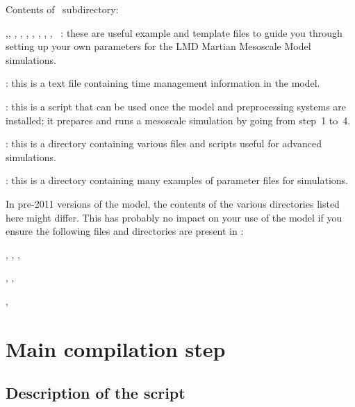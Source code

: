 \sk
Contents of~ subdirectory:
\begin{citemize}
\item {},, , , , , , , , ~: these are useful example and template files to guide you through setting up your own parameters for the LMD Martian Mesoscale Model simulations. 
\item {}: this is a text file containing time management information in the model.
\item {}: this is a  script that can be used once the model and preprocessing systems are installed; it prepares and runs a mesoscale simulation by going from step~1 to~4. 
\item {}: this is a directory containing various files and scripts useful for advanced simulations.
\item {}: this is a directory containing many examples of parameter files for simulations.
\end{citemize}

\sk
\begin{finger}
\item In pre-2011 versions of the model, the contents of the various directories listed here might differ. This has probably no impact on your use of the model if you ensure the following files and directories are present in :
\begin{citemize}
\item {}, , , 
\item {}, , 
\item {}, 
\item {}
\end{citemize}
\end{finger}

\mk
\section{Main compilation step}
\label{sc:makemeso}

\sk
\subsection{Description of the  script}

